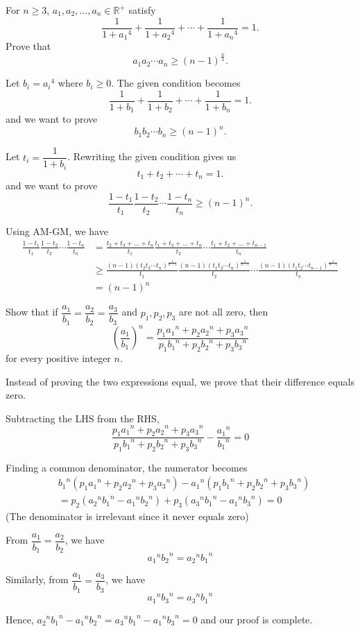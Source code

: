 \begin{prbm}[MACEDONIA 2016] %
For $n \ge 3$, $a_1, a_2, \dots , a_n \in \mathbb{R}^{+}$ satisfy \[ \frac{1}{1+{a_1}^4}+\frac{1}{1+{a_2}^4}+\cdots+\frac{1}{1+{a_n}^4}=1. \]
Prove that 
\[ a_1 a_2 \cdots a_n \ge (n-1)^{\frac{n}{4}}. \]
\end{prbm}

\begin{solution}
Let $b_i={a_i}^4$ where $b_i \ge 0$. 
The given condition becomes \[ \frac{1}{1+b_1}+\frac{1}{1+b_2}+\cdots+\frac{1}{1+b_n}=1. \]
and we want to prove \[ b_1 b_2 \cdots b_n \ge (n-1)^n.\]

Let $t_i=\dfrac{1}{1+b_i}$. Rewriting the given condition gives us \[ t_1+t_2+\cdots+t_n=1.\] 
and we want to prove \[ \frac{1-t_1}{t_1} \frac{1-t_2}{t_2} \cdots \frac{1-t_n}{t_n} \ge (n-1)^n. \]

Using AM-GM, we have 
\begin{align*}
\frac{1-t_1}{t_1} \frac{1-t_2}{t_2} \cdots \frac{1-t_n}{t_n}
&= \frac{t_2+t_3+\dots+t_n}{t_1} \frac{t_1+t_3+\dots+t_n}{t_2} \cdots \frac{t_1+t_2+\dots+t_{n-1}}{t_n} \\
&\ge \frac{(n-1)(t_2  t_3 \cdots t_n)^\frac{1}{n-1}}{t_1} \frac{(n-1)(t_1  t_3 \cdots t_n)^\frac{1}{n-1}}{t_2} \cdots \frac{(n-1)(t_1  t_2 \cdots t_{n-1})^\frac{1}{n-1}}{t_n} \\
&= (n-1)^n
\end{align*}
\end{solution}
\pagebreak

\begin{prbm}[Canada 1969]
Show that if $\dfrac{a_1}{b_1}=\dfrac{a_2}{b_2}=\dfrac{a_3}{b_3}$ and $p_1,p_2,p_3$ are not all zero, then 
\[ \left(\frac{a_1}{b_1} \right)^n=\frac{p_1{a_1}^n+p_2{a_2}^n+p_3{a_3}^n}{p_1{b_1}^n+p_2{b_2}^n+p_3{b_3}^n}\]
for every positive integer $n$.
\end{prbm}

\begin{solution}
Instead of proving the two expressions equal, we prove that their difference equals zero.

Subtracting the LHS from the RHS, 
\[ \frac{p_1{a_1}^n+p_2{a_2}^n+p_3{a_3}^n}{p_1{b_1}^n+p_2{b_2}^n+p_3{b_3}^n}-\frac{{a_1}^n}{{b_1}^n}=0\]

Finding a common denominator, the numerator becomes 
\begin{align*}
&{b_1}^n (p_1{a_1}^n+p_2{a_2}^n+p_3{a_3}^n) - {a_1}^n(p_1{b_1}^n+p_2{b_2}^n+p_3{b_3}^n) \\
&= p_2({a_2}^n {b_1}^n - {a_1}^n {b_2}^n)+p_3({a_3}^n {b_1}^n - {a_1}^n {b_3}^n)=0
\end{align*}
(The denominator is irrelevant since it never equals zero)

From $\dfrac{a_1}{b_1}=\dfrac{a_2}{b_2}$, we have 
\[ {a_1}^n {b_2}^n={a_2}^n {b_1}^n \]

Similarly, from $\dfrac{a_1}{b_1}=\dfrac{a_3}{b_3}$, we have 
\[ {a_1}^n {b_3}^n={a_3}^n {b_1}^n \]

Hence, ${a_2}^n {b_1}^n - {a_1}^n {b_2}^n={a_3}^n {b_1}^n - {a_1}^n {b_3}^n=0$ and our proof is complete.
\end{solution}
\pagebreak

